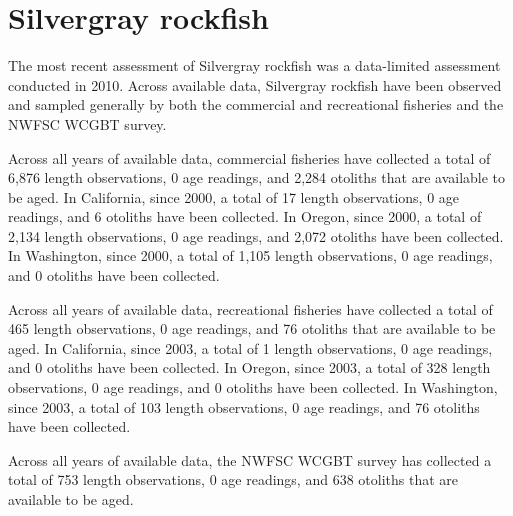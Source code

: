 \documentclass[11pt,
  english,
  letterpaper,
]{article}
\begin{document}

\hypertarget{silvergray-rockfish}{%
\section{Silvergray rockfish}\label{silvergray-rockfish}}

\leavevmode\tagmcend\tagstructend


The most recent assessment of Silvergray rockfish was a data-limited assessment conducted in 2010. Across available data, Silvergray rockfish have been observed and sampled generally by both the commercial and recreational fisheries and the NWFSC WCGBT survey.

\leavevmode\tagmcend\tagstructend\par


Across all years of available data, commercial fisheries have collected a total of 6,876 length observations, 0 age readings, and 2,284 otoliths that are available to be aged. In California, since 2000, a total of 17 length observations, 0 age readings, and 6 otoliths have been collected. In Oregon, since 2000, a total of 2,134 length observations, 0 age readings, and 2,072 otoliths have been collected. In Washington, since 2000, a total of 1,105 length observations, 0 age readings, and 0 otoliths have been collected.

\leavevmode\tagmcend\tagstructend\par


Across all years of available data, recreational fisheries have collected a total of 465 length observations, 0 age readings, and 76 otoliths that are available to be aged. In California, since 2003, a total of 1 length observations, 0 age readings, and 0 otoliths have been collected. In Oregon, since 2003, a total of 328 length observations, 0 age readings, and 0 otoliths have been collected. In Washington, since 2003, a total of 103 length observations, 0 age readings, and 76 otoliths have been collected.

\leavevmode\tagmcend\tagstructend\par


Across all years of available data, the NWFSC WCGBT survey has collected a total of 753 length observations, 0 age readings, and 638 otoliths that are available to be aged.
\end{document}
